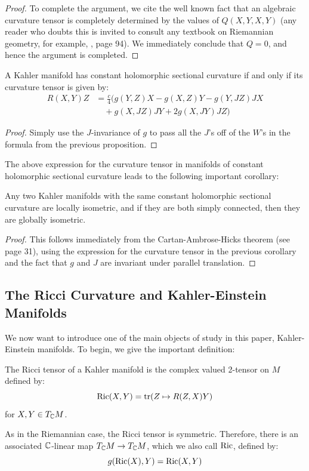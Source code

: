 \begin{proof}
To complete the argument, we cite the well known fact that an algebraic curvature tensor is completely determined by the values of $Q(X,Y,X,Y)$ (any reader who doubts this is invited to consult any textbook on Riemannian geometry, for example, \cite{dC}, page 94).  We immediately conclude that $Q = 0$, and hence the argument is completed.
%
\end{proof}

\begin{cor} A Kahler manifold has constant holomorphic sectional curvature if and only if its curvature tensor is given by:
%
\begin{align*}
R(X,Y)Z &= \frac{c}{4} (g(Y,Z)X - g(X,Z)Y - g(Y,JZ)JX  \\
& \quad + g(X, JZ)JY + 2 g(X,JY)JZ )
\end{align*}
%
\end{cor}

\begin{proof}  Simply use the $J$-invariance of $g$ to pass all the $J$'s off of the $W$'s in the formula from the previous proposition.
\end{proof}

The above expression for the curvature tensor in manifolds of constant holomorphic sectional curvature leads to the following important corollary:

\begin{cor} Any two Kahler manifolds with the same constant holomorphic sectional curvature are locally isometric, and if they are both simply connected, then they are globally isometric.
\end{cor}

\begin{proof} This follows immediately from the Cartan-Ambrose-Hicks theorem (see \cite{CE} page 31), using the expression for the curvature tensor in the previous corollary and the fact that $g$ and $J$ are invariant under parallel translation.
\end{proof}

\subsection{The Ricci Curvature and Kahler-Einstein Manifolds}

We now want to introduce one of the main objects of study in this paper, Kahler-Einstein manifolds.  To begin, we give the important definition:
%
\begin{definition} The Ricci tensor of a Kahler manifold is the complex valued 2-tensor on $M$ defined by:
$$ \text{Ric} (X, Y) = \text{tr}( Z \mapsto R(Z,X)Y )$$
for $X,Y \in T_{\mathbb{C}} M$.
\end{definition}
%
As in the Riemannian case, the Ricci tensor is symmetric.  Therefore, there is an associated $\mathbb{C}$-linear map $T_{\mathbb{C}} M \rightarrow T_{\mathbb{C}} M$, which we also call $\text{Ric}$, defined by:
%
$$ g( \text{Ric} (X), Y ) = \text{Ric} ( X, Y ) $$

